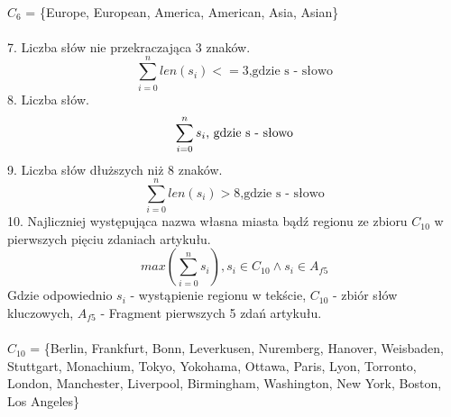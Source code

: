 \documentclass{classrep}
\begin{document}
\\
$C_6$ = \{Europe, European, America, American, Asia, Asian\}\\
\\
7. Liczba słów nie przekraczająca 3 znaków.\\
\begin{displaymath}
\sum_{i=0}^{n}len(s_i)<= 3 \textrm{,gdzie s - słowo}
\end{displaymath}
8. Liczba słów.\\
\begin{displaymath}
\sum_{i = 0}^{n} s_i \textrm{, gdzie s - słowo}\\
\end{displaymath}
9. Liczba słów dłuższych niż 8 znaków.\\
\begin{displaymath}
\sum_{i=0}^{n}len(s_i) > 8 \textrm{,gdzie s - słowo}
\end{displaymath}
10. Najliczniej występująca nazwa własna miasta bądź regionu ze zbioru $C_{10}$ w  pierwszych pięciu zdaniach artykułu. \\
\begin{displaymath}
max\left(\sum_{i = 0}^{n} s_{i}\right), s_i \in C_{10} \wedge s_i \in A_{f5}
\end{displaymath}
Gdzie odpowiednio $s_i$ - wystąpienie regionu w tekście, $C_{10}$ -  zbiór słów kluczowych, $A_{f5}$ - Fragment pierwszych 5 zdań artykułu.\\
\\
$C_{10}$ = \{Berlin, Frankfurt, Bonn, Leverkusen, Nuremberg, Hanover, Weisbaden, 
Stuttgart, Monachium, Tokyo, Yokohama, Ottawa, Paris, Lyon, Torronto, London, Manchester, Liverpool, Birmingham, Washington, New York, Boston, Los Angeles\}
\noindent
\end{document}
